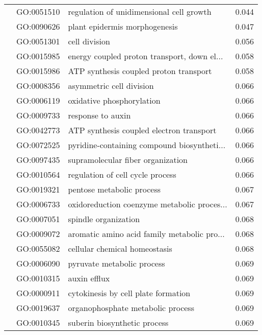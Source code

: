 \begin{longtable}{lllr}
   & GO:0051510 &     regulation of unidimensional cell growth &         0.044 \\
   & GO:0090626 &                plant epidermis morphogenesis &         0.047 \\
   & GO:0051301 &                                cell division &         0.056 \\
   & GO:0015985 &  energy coupled proton transport, down el... &         0.058 \\
   & GO:0015986 &       ATP synthesis coupled proton transport &         0.058 \\
   & GO:0008356 &                     asymmetric cell division &         0.066 \\
   & GO:0006119 &                    oxidative phosphorylation &         0.066 \\
   & GO:0009733 &                            response to auxin &         0.066 \\
   & GO:0042773 &     ATP synthesis coupled electron transport &         0.066 \\
   & GO:0072525 &  pyridine-containing compound biosyntheti... &         0.066 \\
   & GO:0097435 &            supramolecular fiber organization &         0.066 \\
   & GO:0010564 &             regulation of cell cycle process &         0.066 \\
   & GO:0019321 &                    pentose metabolic process &         0.067 \\
   & GO:0006733 &  oxidoreduction coenzyme metabolic proces... &         0.067 \\
   & GO:0007051 &                         spindle organization &         0.068 \\
   & GO:0009072 &  aromatic amino acid family metabolic pro... &         0.068 \\
   & GO:0055082 &                cellular chemical homeostasis &         0.068 \\
   & GO:0006090 &                   pyruvate metabolic process &         0.069 \\
   & GO:0010315 &                                 auxin efflux &         0.069 \\
   & GO:0000911 &          cytokinesis by cell plate formation &         0.069 \\
   & GO:0019637 &            organophosphate metabolic process &         0.069 \\
   & GO:0010345 &                 suberin biosynthetic process &         0.069 \\

\end{longtable}
